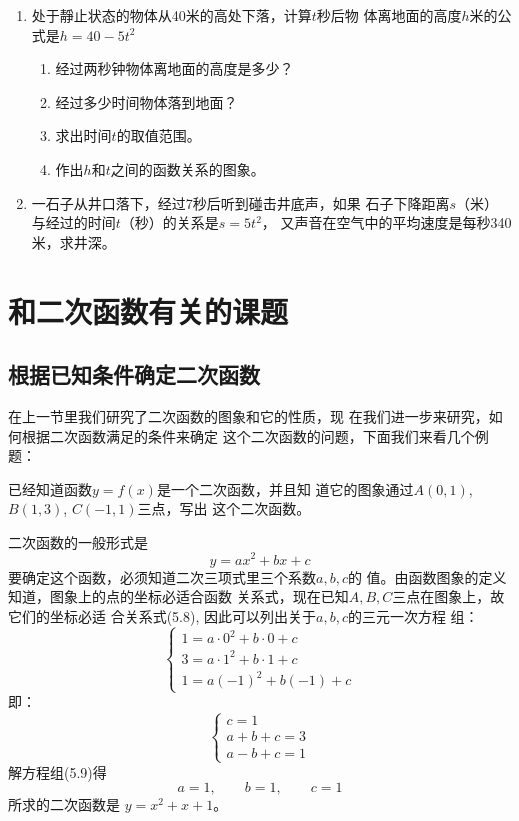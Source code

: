 \begin{enumerate}
\item 处于靜止状态的物体从40米的高处下落，计算$t$秒后物
体离地面的高度$h$米的公式是$h=40-5t^2$
\begin{enumerate}
    \item 经过两秒钟物体离地面的高度是多少？
    \item 经过多少时间物体落到地面？
    \item 求出时间$t$的取值范围。
    \item 作出$h$和$t$之间的函数关系的图象。
\end{enumerate}

\item 一石子从井口落下，经过7秒后听到碰击井底声，如果
石子下降距离$s$（米）与经过的时间$t$（秒）的关系是$s=5t^2$，
又声音在空气中的平均速度是每秒340米，求井深。
\end{enumerate}

\section{和二次函数有关的课题}
\subsection{根据已知条件确定二次函数}
在上一节里我们研究了二次函数的图象和它的性质，现
在我们进一步来研究，如何根据二次函数满足的条件来确定
这个二次函数的问题，下面我们来看几个例题：


\begin{example}
    已经知道函数$y=f(x)$是一个二次函数，并且知
道它的图象通过$A(0,1)$, $B(1,3)$, $C(-1,1)$三点，写出
这个二次函数。
\end{example}

\begin{solution}
二次函数的一般形式是
\begin{equation}
    y=ax^2+bx+c
\end{equation}
要确定这个函数，必须知道二次三项式里三个系数$a,b,c$的
值。由函数图象的定义知道，图象上的点的坐标必适合函数
关系式，现在已知$A,B,C$三点在图象上，故它们的坐标必适
合关系式(5.8), 因此可以列出关于$a,b,c$的三元一次方程
组：
\[\begin{cases}
    1=a\cdot 0^2+b\cdot 0+c\\
3=a\cdot 1^2+b\cdot 1+c\\
1=a(-1)^2+b(-1)+c
\end{cases}\]
即：
\begin{equation}
    \begin{cases}
        c=1\\
a+b+c=3\\
a-b+c=1
    \end{cases}
\end{equation}
解方程组(5.9)得
\[a=1,\qquad b=1,\qquad c=1\]
所求的二次函数是
$y=x^2+x+1$。
\end{solution}
    

